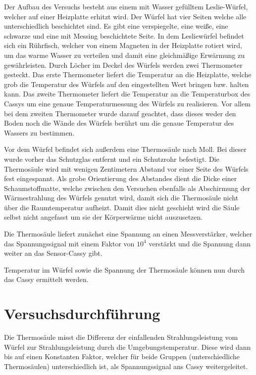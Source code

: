 \documentclass[a4paper, 11pt]{article}
\begin{document}
Der Aufbau des Versuchs besteht aus einem mit Wasser gefülltem Leslie-Würfel, welcher auf einer Heizplatte erhitzt wird. Der Würfel hat vier Seiten welche alle unterschiedlich beschichtet sind. Es gibt eine verspiegelte, eine weiße, eine schwarze und eine mit Messing beschichtete Seite. In dem Lesliewürfel befindet sich ein Rührfisch, welcher von einem Magneten in der Heizplatte rotiert wird, um das warme Wasser zu verteilen und damit eine gleichmäßige Erwärmung zu gewährleisten. Durch Löcher im Deckel des Würfels werden zwei Thermometer gesteckt. Das erste Thermometer liefert die Temperatur an die Heizplatte, welche grob die Temperatur des Würfels auf den eingestellten Wert bringen bzw. halten kann. Das zweite Thermometer liefert die Temperatur an die Temperaturbox des Cassys um eine genaue Temperaturmessung des Würfels zu realisieren. Vor allem bei dem zweiten Thermometer wurde darauf geachtet, dass dieses weder den Boden noch die Wände des Würfels berührt um die genaue Temperatur des Wassers zu bestimmen.

Vor dem Würfel befindet sich außerdem eine Thermosäule nach Moll. Bei dieser wurde vorher das Schutzglas entfernt und ein Schutzrohr befestigt.
Die Thermosäule wird mit wenigen Zentimetern Abstand vor einer Seite des Würfels fest eingespannt. Als grobe Orientierung des Abstandes dient die Dicke einer Schaumstoffmatte, welche zwischen den Versuchen ebenfalls als Abschirmung der Wärmestrahlung des Würfels genutzt wird, damit sich die Thermosäule nicht über die Raumtemperatur aufheizt. Damit dies nicht geschieht wird die Säule selbst nicht angefasst um sie der Körperwärme nicht auszusetzen.

Die Thermosäule liefert zunächst eine Spannung an einen Messverstärker, welcher das Spannungssignal mit einem Faktor von $10^4$ verstärkt und die Spannung dann weiter an das Sensor-Cassy gibt.

Temperatur im Würfel sowie die Spannung der Thermosäule können nun durch das Cassy ermittelt werden.



\section{Versuchsdurchführung}

Die Thermosäule misst die Differenz der einfallenden Strahlungsleistung vom Würfel zur Strahlungsleistung durch die Umgebungstemperatur. Diese wird dann bis auf einen Konstanten Faktor, welcher für beide Gruppen (unterschiedliche Thermosäulen) unterschiedlich ist, als Spannungssignal ans Cassy weitergeleitet.
\end{document}
